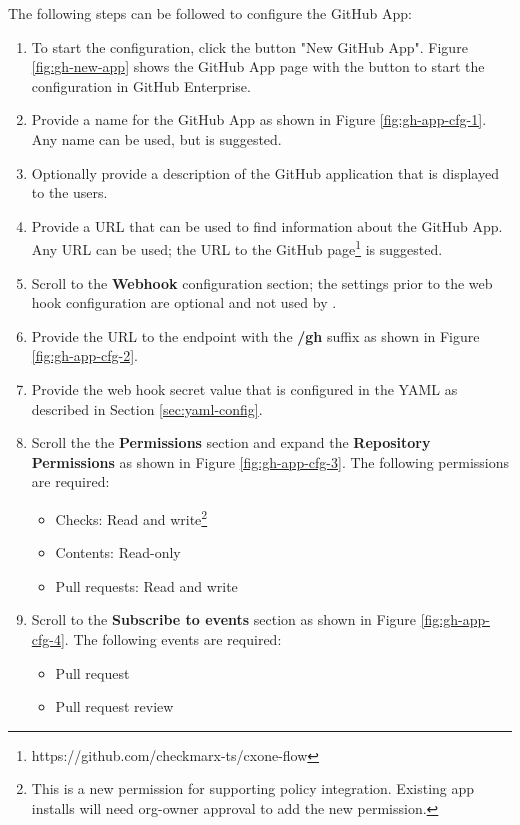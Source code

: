 The following steps can be followed to configure the \cxoneflow GitHub App:

\begin{enumerate}
    \item To start the configuration, click the button "New GitHub App". Figure \ref{fig:gh-new-app} shows
    the GitHub App page with the button to start the configuration in GitHub Enterprise.
    \item Provide a name for the GitHub App as shown in Figure \ref{fig:gh-app-cfg-1}.  Any name
    can be used, but \cxoneflow is suggested.
    \item Optionally provide a description of the GitHub application that is displayed to the users.
    \item Provide a URL that can be used to find information about the \cxoneflow GitHub App.  Any URL
    can be used; the URL to the \cxoneflow GitHub page\footnote{https://github.com/checkmarx-ts/cxone-flow}
    is suggested.
    \item Scroll to the \textbf{Webhook} configuration section; the settings prior to the web hook configuration
    are optional and not used by \cxoneflow.
    \item Provide the URL to the \cxoneflow endpoint with the \textbf{/gh} suffix as shown in Figure \ref{fig:gh-app-cfg-2}.
    \item Provide the web hook secret value that is configured in the \cxoneflow YAML as described in Section \ref{sec:yaml-config}.
    \item Scroll the the \textbf{Permissions} section and expand the \textbf{Repository Permissions} as shown in
    Figure \ref{fig:gh-app-cfg-3}.  The following permissions are required:
    \begin{itemize}
        \item Checks: Read and write\footnote{This is a new permission for supporting \cxone policy integration.  Existing app installs will need org-owner approval to add the new permission.}
        \item Contents: Read-only
        \item Pull requests: Read and write
    \end{itemize}
    \item Scroll to the \textbf{Subscribe to events} section as shown in Figure \ref{fig:gh-app-cfg-4}.  The following events are required:
    \begin{itemize}
        \item Pull request
        \item Pull request review

\end{itemize}
\end{enumerate}

